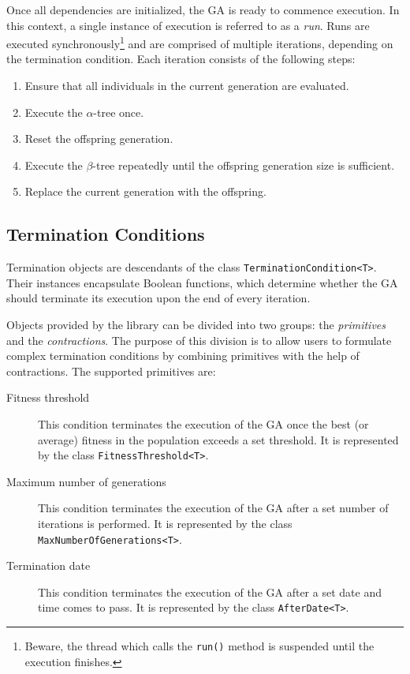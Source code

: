 Once all dependencies are initialized, the GA is ready to commence execution. In this context, a single instance of execution is referred to as a \textit{run}. Runs are executed synchronously\footnote{Beware, the thread which calls the \texttt{run()} method is suspended until the execution finishes.} and are comprised of multiple iterations, depending on the termination condition. Each iteration consists of the following steps:
~
\begin{enumerate}
	\item Ensure that all individuals in the current generation are evaluated.
	\item Execute the $\alpha$-tree once.
	\item Reset the offspring generation.
	\item Execute the $\beta$-tree repeatedly until the offspring generation size is sufficient.
	\item Replace the current generation with the offspring.
\end{enumerate}

\subsection{Termination Conditions}\label{section:termination-conditions}
Termination objects are descendants of the class \texttt{TerminationCondition<T>}. Their instances encapsulate Boolean functions, which determine whether the GA should terminate its execution upon the end of every iteration.

Objects provided by the library can be divided into two groups: the \textit{primitives} and the \textit{contractions}. The purpose of this division is to allow users to formulate complex termination conditions by combining primitives with the help of contractions. The supported primitives are:
~
\begin{description}
	\item[Fitness threshold]
	This condition terminates the execution of the GA once the best (or average) fitness in the population exceeds a set threshold. It is represented by the class \texttt{FitnessThreshold<T>}.

	\item[Maximum number of generations]
	This condition terminates the execution of the GA after a set number of iterations is performed. It is represented by the class \texttt{MaxNumberOfGenerations<T>}.

	\item[Termination date]
	This condition terminates the execution of the GA after a set date and time comes to pass. It is represented by the class \texttt{AfterDate<T>}.
\end{description}

